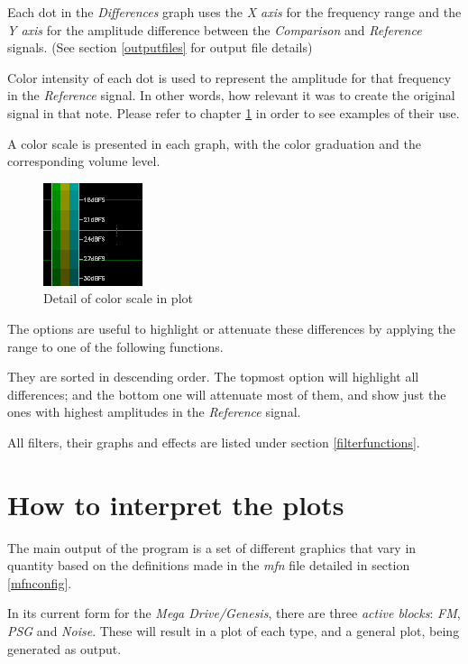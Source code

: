 \documentclass[10pt,a4paper]{report}
\begin{document}
Each dot in the \textit{Differences} graph uses the \textit{X axis} for the frequency range and the \textit{Y axis} for the amplitude difference between the \textit{Comparison} and \textit{Reference} signals. (See section \ref{outputfiles} for output file details)

Color intensity of each dot is used to represent the amplitude for that frequency in the \textit{Reference} signal. In other words, how relevant it was to create the original signal in that note. Please refer to chapter \ref{howtoplots} in order to see examples of their use.

A color scale is presented in each graph, with the color graduation and the corresponding volume level.

\begin{figure}[H]
	\centering
	\includegraphics[width=0.2\linewidth]{plots/colorscale}
	\caption{Detail of color scale in plot}
	\label{fig:colorscale}
\end{figure}


The options are useful to highlight or attenuate these differences by applying the range to one of the following functions. 

They are sorted in descending order. The topmost option will highlight all differences; and the bottom one will attenuate most of them, and show just the ones with highest amplitudes in the \textit{Reference} signal.

All filters, their graphs and effects are listed under section \ref{filterfunctions}.

\chapter{How to interpret the plots}
\label{howtoplots}

The main output of the program is a set of different graphics that vary in quantity based on the definitions made in the \textit{mfn} file detailed in section \ref{mfnconfig}.

In its current form for the \textit{Mega Drive/Genesis}, there are three \textit{active blocks}: \textit{FM}, \textit{PSG} and \textit{Noise}. These will result in a plot of each type, and a general plot, being generated as output.
\end{document}
